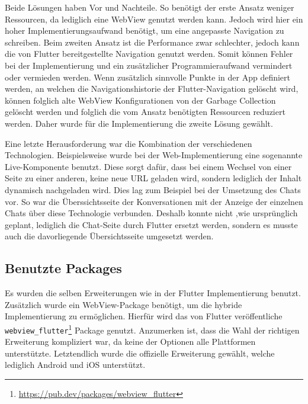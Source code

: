 Beide Lösungen haben Vor und Nachteile. So benötigt der erste Ansatz weniger Ressourcen, da lediglich eine WebView genutzt werden kann. Jedoch wird hier ein hoher Implementierungsaufwand benötigt, um eine angepasste Navigation zu schreiben. 
Beim zweiten Ansatz ist die Performance zwar schlechter, jedoch kann die von Flutter bereitgestellte Navigation genutzt werden. Somit können Fehler bei der Implementierung und ein zusätzlicher Programmieraufwand vermindert oder vermieden werden.
Wenn zusätzlich sinnvolle Punkte in der App definiert werden, an welchen die Navigationshistorie der Flutter-Navigation gelöscht wird, können folglich alte WebView Konfigurationen von der Garbage Collection gelöscht werden und folglich die vom Ansatz benötigten Ressourcen reduziert werden. Daher wurde für die Implementierung die zweite Lösung gewählt. 

Eine letzte Herausforderung war die Kombination der verschiedenen Technologien. Beispielsweise wurde bei der Web-Implementierung eine sogenannte Live-Komponente benutzt. Diese sorgt dafür, dass bei einem Wechsel von einer Seite zu einer anderen, keine neue URL geladen wird, sondern lediglich der Inhalt dynamisch nachgeladen wird. Dies lag zum Beispiel bei der Umsetzung des Chats vor. So war die Überssichtsseite der Konversationen mit der Anzeige der einzelnen Chats über diese Technologie verbunden. Deshalb konnte nicht ,wie ursprünglich geplant, lediglich die Chat-Seite durch Flutter ersetzt werden, sondern es musste auch die davorliegende Übersichtsseite umgesetzt werden.

\subsection{Benutzte Packages}
Es wurden die selben Erweiterungen wie in der Flutter Implementierung benutzt. Zusätzlich wurde ein WebView-Package benötigt, um die hybride Implementierung zu ermöglichen. Hierfür wird das von Flutter veröffentliche \verb|webview_flutter|\footnote{\url{https://pub.dev/packages/webview\_flutter}} Package genutzt. Anzumerken ist, dass die Wahl der richtigen Erweiterung kompliziert war, da keine der Optionen alle Plattformen unterstützte. Letztendlich wurde die offizielle Erweiterung gewählt, welche lediglich Android und iOS unterstützt.


